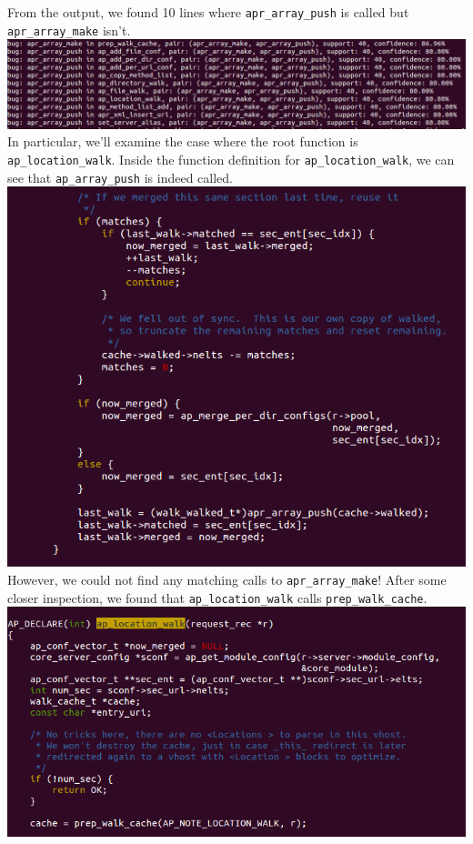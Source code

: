 \documentclass{article}
\begin{document}
From the output, we found 10 lines where \verb|apr_array_push| is called but \verb|apr_array_make| isn't. \\
\includegraphics[scale=0.5]{ss/apr_array_push_false_positives.png}
In particular, we'll examine the case where the root function is \verb|ap_location_walk|. Inside the function definition for \verb|ap_location_walk|, we can see that \verb|ap_array_push| is indeed called. \\
\includegraphics[scale=0.5]{ss/unravel_one_level_proof3.png} \\
However, we could not find any matching calls to \verb|apr_array_make|! After some closer inspection, we found that \verb|ap_location_walk| calls \verb|prep_walk_cache|. \\
\includegraphics[scale=0.5]{ss/unravel_one_deep_proof2.png} \\
\end{document}
